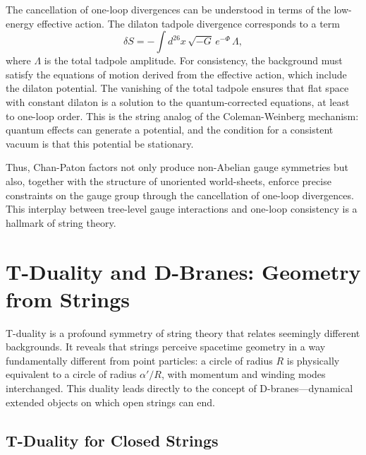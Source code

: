 \documentclass[11pt]{article}
\begin{document}
The cancellation of one-loop divergences can be understood in terms of the low-energy effective action. The dilaton tadpole divergence corresponds to a term
\begin{equation}
\delta S = -\int d^{26}x \, \sqrt{-G} \, e^{-\Phi} \, \Lambda,
\end{equation}
where $\Lambda$ is the total tadpole amplitude. For consistency, the background must satisfy the equations of motion derived from the effective action, which include the dilaton potential. The vanishing of the total tadpole ensures that flat space with constant dilaton is a solution to the quantum-corrected equations, at least to one-loop order. This is the string analog of the Coleman-Weinberg mechanism: quantum effects can generate a potential, and the condition for a consistent vacuum is that this potential be stationary.

Thus, Chan-Paton factors not only produce non-Abelian gauge symmetries but also, together with the structure of unoriented world-sheets, enforce precise constraints on the gauge group through the cancellation of one-loop divergences. This interplay between tree-level gauge interactions and one-loop consistency is a hallmark of string theory.

\section{T-Duality and D-Branes: Geometry from Strings}

T-duality is a profound symmetry of string theory that relates seemingly different backgrounds. It reveals that strings perceive spacetime geometry in a way fundamentally different from point particles: a circle of radius $R$ is physically equivalent to a circle of radius $\alpha'/R$, with momentum and winding modes interchanged. This duality leads directly to the concept of D-branes—dynamical extended objects on which open strings can end.

\subsection{T-Duality for Closed Strings}
\end{document}
